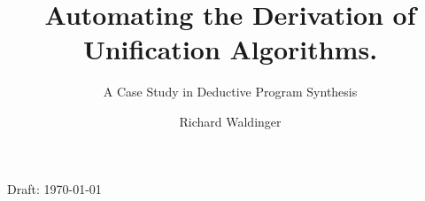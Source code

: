 \documentclass[runningheads]{llncs}
\DeclareMathOperator{\isatm}{\emph{is-atom}}
\DeclareMathOperator{\lef}{\emph{left}}
\DeclareMathOperator{\rig}{\emph{right}}
\begin{document}
%

\title{Automating the Derivation of \\ Unification Algorithms. }

%
\subtitle{A Case Study in Deductive Program Synthesis}
%
\author{Richard Waldinger}
%
%
%
\maketitle              %
\begin{center}Draft: \today \end{center}
%
\newcommand{\e}[1]{e_{#1}}
\renewcommand{\d}[1]{d_{#1}}
\newcommand{\E}[1]{E_{#1}}
\newcommand{\ttt}[1]{t_{#1}}
\newcommand{\expsub}[2]{{#1}_{#2}}
\newcommand{\x}[1]{x_{#1}}
\newcommand{\y}[1]{y_{#1}}
\newcommand{\thet}[1]{\theta_{#1}}
\newcommand{\Thet}[1]{\Theta_{#1}}

\newcommand{\bb}[1]{\mathbb{#1}}

\newcommand{\var}[1]{#1}
\newcommand{\varsub}[2]{{#1}_{#2}}
\newcommand{\cons}{\, \,\begin{picture}(-1,1)(-1,-3)\circle*{3} \end{picture}\, \, \, \, }

\newcommand{\addto}{+ \,}
 

\newcommand{\apply}{\blacktriangleleft}

\newcommand{\compose}{ \blackdiamond }
\newcommand{\fail}{\bot}
\newcommand{\blk}{\ast}
\newcommand{\nil}{\emph{nil}}
\newcommand{\emptysubst}{\{\}}
\newcommand{\moregen}{\succsim_{gen}}
\newcommand{\weakmoregen}{\succsim_{gen^-}}
\newcommand{\issubst}{\emph{is-subst}}
\newcommand{\isprop}{\emph{is-proper}}
\newcommand{\occursin}{\, \varepsilon \,}
\newcommand{\occurseq}{\, \underline{\varepsilon} \,}
\newcommand{\dom}{\emph{dom}}
\newcommand{\range}{\emph{range}}
\newcommand{\misses}{\emph{misses}}
\end{document}
